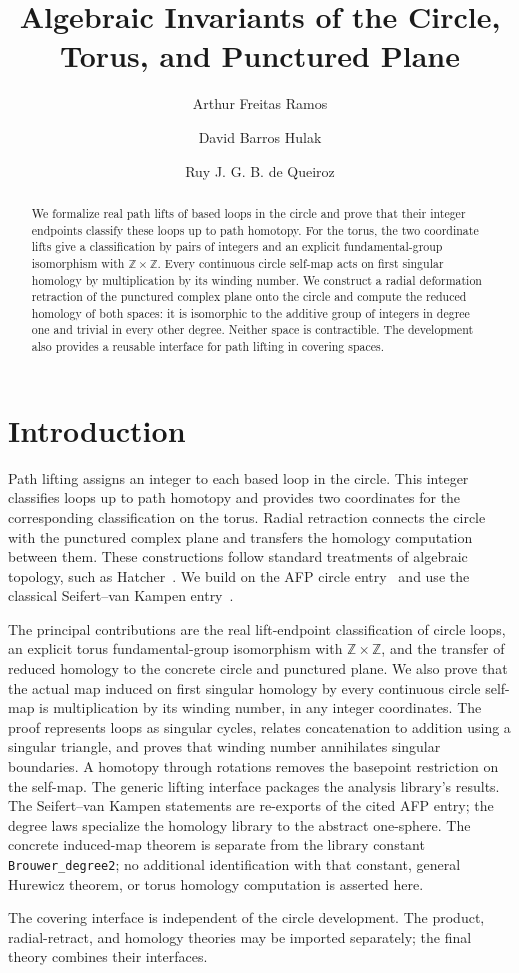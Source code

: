 \documentclass[11pt,a4paper]{article}
\begin{document}
\title{Algebraic Invariants of the Circle, Torus, and Punctured Plane}
\author{Arthur Freitas Ramos \and David Barros Hulak \and Ruy J. G. B. de Queiroz}
\maketitle
\begin{abstract}
  We formalize real path lifts of based loops in the circle and prove that
  their integer endpoints classify these loops up to path homotopy.  For
  the torus, the two coordinate lifts give a classification by pairs of
  integers and an explicit fundamental-group isomorphism with
  $\mathbb{Z}\times\mathbb{Z}$. Every continuous circle self-map acts on
  first singular homology by multiplication by its winding number.
  We construct a radial deformation retraction of the
  punctured complex plane onto the circle and compute the reduced homology
  of both spaces: it is isomorphic to the additive group of integers in
  degree one and trivial in every other degree.  Neither space is
  contractible.  The development also provides a reusable interface for
  path lifting in covering spaces.
\end{abstract}
\tableofcontents
\section{Introduction}
Path lifting assigns an integer to each based loop in the circle.  This
integer classifies loops up to path homotopy and provides two coordinates
for the corresponding classification on the torus.  Radial retraction
connects the circle with the punctured complex plane and transfers the
homology computation between them.  These constructions follow standard
treatments of algebraic topology, such as Hatcher~\cite{Hatcher2002}.
We build on the AFP circle
entry~\cite{FundamentalGroupCircleAFP} and use the classical
Seifert--van Kampen entry~\cite{SeifertVanKampenAFP}.

The principal contributions are the real lift-endpoint classification of
circle loops, an explicit torus fundamental-group isomorphism with
$\mathbb{Z}\times\mathbb{Z}$, and the transfer of reduced homology to the
concrete circle and punctured plane. We also prove that the actual map
induced on first singular homology by every continuous circle self-map
is multiplication by its winding number, in any integer coordinates.
The proof represents loops as singular cycles, relates concatenation to
addition using a singular triangle, and proves that winding number
annihilates singular boundaries. A homotopy through rotations removes
the basepoint restriction on the self-map.
The generic lifting interface packages the analysis library's results.
The Seifert--van Kampen statements are re-exports of the cited AFP entry;
the degree laws specialize the homology library to the abstract one-sphere.
The concrete induced-map theorem is separate from the library constant
\texttt{Brouwer\_degree2}; no additional identification with that constant,
general Hurewicz theorem, or torus homology computation is asserted here.

The covering interface is independent of the circle development.  The
product, radial-retract, and homology theories may be imported separately;
the final theory combines their interfaces.



\end{document}
